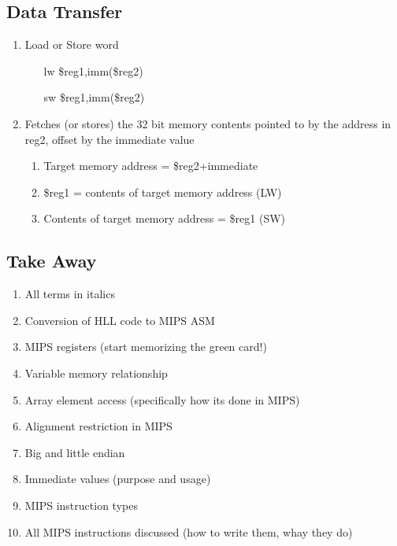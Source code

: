 \documentclass[12pt]{article}
\begin{document}
\subsection{Data Transfer}
\begin{enumerate}
  \item Load or Store word
  \begin{enumerate}
    \item[lw] \$reg1,imm(\$reg2)
    \item[sw] \$reg1,imm(\$reg2)
  \end{enumerate}
  \item Fetches (or stores) the 32 bit memory contents pointed to by the address in reg2, offset by the immediate value
  \begin{enumerate}
    \item Target memory address = \$reg2+immediate
    \item \$reg1 = contents of target memory address (LW)
    \item Contents of target memory address = \$reg1 (SW)
  \end{enumerate}
\end{enumerate}

\subsection{Take Away}
\begin{enumerate}
  \item All terms in italics
  \item Conversion of HLL code to MIPS ASM
  \item MIPS registers (start memorizing the green card!)
  \item Variable memory relationship
  \item Array element access (specifically how its done in MIPS)
  \item Alignment restriction in MIPS
  \item Big and little endian
  \item Immediate values (purpose and usage)
  \item MIPS instruction types
  \item All MIPS instructions discussed (how to write them, whay they do)
\end{enumerate}
\end{document}
